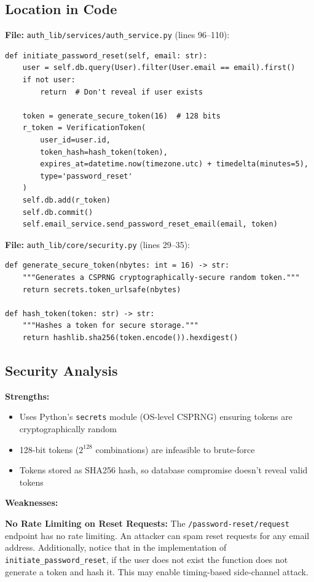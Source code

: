\documentclass[11pt,a4paper]{article}
\begin{document}
\subsection{Location in Code}

\textbf{File:} \texttt{auth\_lib/services/auth\_service.py} (lines 96--110):
\begin{lstlisting}
def initiate_password_reset(self, email: str):
    user = self.db.query(User).filter(User.email == email).first()
    if not user:
        return  # Don't reveal if user exists

    token = generate_secure_token(16)  # 128 bits
    r_token = VerificationToken(
        user_id=user.id,
        token_hash=hash_token(token),
        expires_at=datetime.now(timezone.utc) + timedelta(minutes=5),
        type='password_reset'
    )
    self.db.add(r_token)
    self.db.commit()
    self.email_service.send_password_reset_email(email, token)
\end{lstlisting}

\textbf{File:} \texttt{auth\_lib/core/security.py} (lines 29--35):
\begin{lstlisting}
def generate_secure_token(nbytes: int = 16) -> str:
    """Generates a CSPRNG cryptographically-secure random token."""
    return secrets.token_urlsafe(nbytes)

def hash_token(token: str) -> str:
    """Hashes a token for secure storage."""
    return hashlib.sha256(token.encode()).hexdigest()
\end{lstlisting}

\subsection{Security Analysis}

\textbf{Strengths:}
\begin{itemize}[noitemsep]
    \item Uses Python's \texttt{secrets} module (OS-level CSPRNG) ensuring tokens are cryptographically random
    \item 128-bit tokens ($2^{128}$ combinations) are infeasible to brute-force
    \item Tokens stored as SHA256 hash, so database compromise doesn't reveal valid tokens
\end{itemize}

\textbf{Weaknesses:}

\textbf{No Rate Limiting on Reset Requests:} The \texttt{/password-reset/request} endpoint has no rate limiting. An attacker can spam reset requests for any email address. Additionally, notice that in the implementation of \texttt{initiate\_password\_reset}, if the user does not exist the function does not generate a token and hash it. This may enable timing-based side-channel attack.
\end{document}
